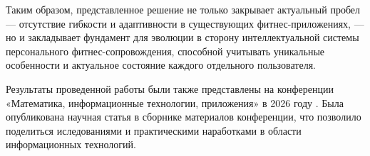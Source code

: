 Таким образом, представленное решение не только закрывает актуальный пробел — отсутствие гибкости и адаптивности в существующих фитнес-приложениях, — но и закладывает фундамент для эволюции в сторону интеллектуальной системы персонального фитнес-сопровождения, способной учитывать уникальные особенности и актуальное состояние каждого отдельного пользователя.

Результаты проведенной работы были также представлены на конференции «Математика, информационные технологии, приложения» в 2026 году \cite{refo}. Была опубликована научная статья в сборнике материалов конференции, что позволило поделиться иследованиями и практическими наработками в области информационных технологий.